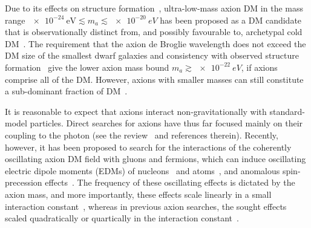 Due to its effects on structure formation~\cite{Khlopov1985}, ultra-low-mass axion DM in the mass range $\SI{e-24}{\electronvolt} \lesssim m_a \lesssim \SI{e-20}{eV}$ has been proposed as a DM candidate that is observationally distinct from, and possibly favourable to, archetypal cold DM~\cite{Hu2000,Marsh2014,Schive2014,Marsh2015Review,Hui2017}.
The requirement that the axion de Broglie wavelength does not exceed the DM size of the smallest dwarf galaxies and consistency with observed structure formation~\cite{Marsh2015B,Schive2015,Marsh2017} give the lower axion mass bound $m_a \gtrsim \SI{e-22}{eV}$, if axions comprise all of the DM\@. However, axions with smaller masses can still constitute a sub-dominant fraction of DM~\cite{Hlozek15}.

It is reasonable to expect that axions interact non-gravitationally with standard-model particles.
Direct searches for axions have thus far focused mainly on their coupling to the photon (see the review~\cite{Axion-Review2015} and references therein).
Recently, however, it has been proposed to search for the interactions of the coherently oscillating axion DM field with gluons and fermions, which can induce oscillating electric dipole moments (EDMs) of nucleons~\cite{Graham2011} and atoms~\cite{Stadnik2014A,Roberts2014A,Roberts2014B}, and anomalous spin-precession effects~\cite{Flambaum2013Patras,Stadnik2014A,Graham2013}.
The frequency of these oscillating effects is dictated by the axion mass, and more importantly, these effects scale linearly in a small interaction constant~\cite{Graham2011,Stadnik2014A,Roberts2014A,Roberts2014B,Flambaum2013Patras,Graham2013}, whereas in previous axion searches, the sought effects scaled quadratically or quartically in the interaction constant~\cite{Axion-Review2015}.

